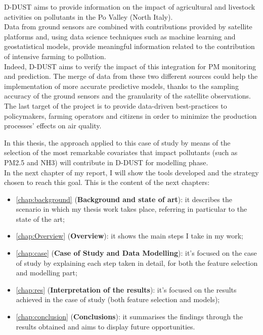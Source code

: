 D-DUST aims to provide information on the impact of agricultural and livestock activities on pollutants in the Po Valley (North Italy).\\
Data from ground sensors are combined with contributions provided by satellite platforms and, using data science techniques such as machine learning and geostatistical models, provide meaningful information related to the contribution of intensive farming to pollution.\\
Indeed, D-DUST aims to verify the impact of this integration for PM monitoring and prediction. 
The merge of data from these two different sources could help the implementation of more accurate predictive models, thanks to the sampling accuracy of the ground sensors and the granularity of the satellite observations.\\
The last target of the project is to provide data-driven best-practices to policymakers, farming operators and citizens in order to minimize the production processes' effects on air quality.\par
In this thesis, the approach applied to this case of study by means of the selection of the most remarkable covariates that impact pollutants (such as PM2.5 and NH3) will contribute in D-DUST for modelling phase.\\
In the next chapter of my report, I will show the tools developed and the strategy chosen to reach this goal. 
This is the content of the next chapters:

\begin{itemize}
  \item \autoref{chap:background} (\textbf{Background and state of art}): it describes the scenario in which my thesis work takes place, referring in particular to the state of the art;
  \item \autoref{chap:Overview} (\textbf{Overview}): it shows the main steps I take in my work;
  \item \autoref{chap:case} (\textbf{Case of Study and Data Modelling}): it's focused on the case of study by explaining each step taken in detail, for both the feature selection and modelling part;
 \item \autoref{chap:res} (\textbf{Interpretation of the results}): it's focused on the results achieved in the case of study (both feature selection and models);
 \item \autoref{chap:conclusion} (\textbf{Conclusions}): it summarises the findings through the results obtained and aims to display future opportunities.  
\end{itemize}